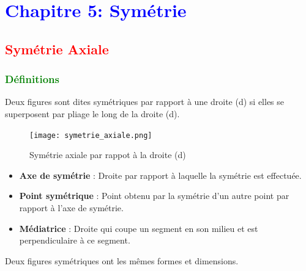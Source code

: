 \documentclass{article}
\begin{document}
\newpage
\section{\textcolor{blue}{Chapitre 5: Symétrie}}

\subsection{\textcolor{red}{Symétrie Axiale}}

\subsubsection{\textcolor{green}{Définitions}}

\begin{tcolorbox}[colback=red!10!white, colframe=red!75!black, title=\textcolor{white}{Définition : Symétrie Axiale}, sharp corners=south]
     Deux figures sont dites symétriques par rapport à une droite (d) si elles se superposent par pliage le long de la droite (d).
\end{tcolorbox}

\begin{figure}[H]
    \centering
    \texttt{[image: symetrie\_axiale.png]}
    \caption{Symétrie axiale par rappot à la droite (d)}
    \label{fig:enter-label}
\end{figure}

\begin{tcolorbox}[colback=purple!10!white, colframe=pink!75!black, title=\textcolor{white}{Vocabulaire}, sharp corners=south]
    \begin{itemize}
        \item \textbf{Axe de symétrie} : Droite par rapport à laquelle la symétrie est effectuée.
        \item \textbf{Point symétrique} : Point obtenu par la symétrie d'un autre point par rapport à l'axe de symétrie.
        \item \textbf{Médiatrice} : Droite qui coupe un segment en son milieu et est perpendiculaire à ce segment.
    \end{itemize}
\end{tcolorbox}

\vspace{0.2cm}

\begin{tcolorbox}[colback=purple!10!white, colframe=purple!75!black, title=\textcolor{white}{Note}, sharp corners=south]
Deux figures symétriques ont les mêmes formes et dimensions.
\end{tcolorbox}
\end{document}
